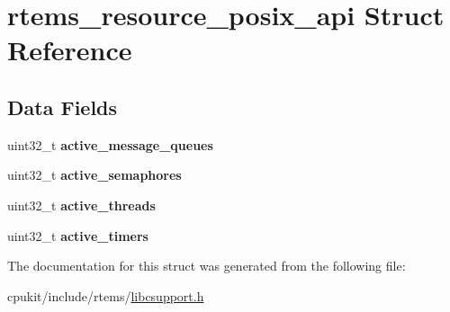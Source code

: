 \hypertarget{structrtems__resource__posix__api}{}\section{rtems\+\_\+resource\+\_\+posix\+\_\+api Struct Reference}
\label{structrtems__resource__posix__api}
\subsection*{Data Fields}
\begin{DoxyCompactItemize}
\item 
\mbox{\label{structrtems__resource__posix__api_afdbf0383e357fbcf0564fc628e593ea8}} 
uint32\+\_\+t {\bfseries active\+\_\+message\+\_\+queues}
\item 
\mbox{\label{structrtems__resource__posix__api_ab0299420ba688239757dbed383b72c5d}} 
uint32\+\_\+t {\bfseries active\+\_\+semaphores}
\item 
\mbox{\label{structrtems__resource__posix__api_af5295ff3c374bb40fab48b737c6d9c5b}} 
uint32\+\_\+t {\bfseries active\+\_\+threads}
\item 
\mbox{\label{structrtems__resource__posix__api_a18ca3e5e17436f863169f03760f9eda9}} 
uint32\+\_\+t {\bfseries active\+\_\+timers}
\end{DoxyCompactItemize}


The documentation for this struct was generated from the following file\+:\begin{DoxyCompactItemize}
\item 
cpukit/include/rtems/\mbox{\hyperlink{libcsupport_8h}{libcsupport.\+h}}\end{DoxyCompactItemize}
